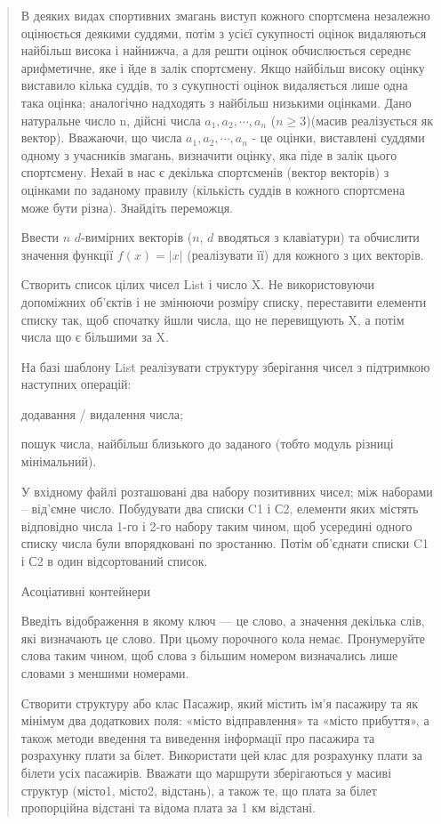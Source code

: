 \documentclass[]{article}
\begin{document}
\begin{quote}
В деяких видах спортивних змагань виступ кожного спортсмена незалежно
оцінюється деякими суддями, потім з усієї сукупності оцінок видаляються
найбільш висока і найнижча, а для решти оцінок обчислюється середнє
арифметичне, яке і йде в залік спортсмену. Якщо найбільш високу оцінку
виставило кілька суддів, то з сукупності оцінок видаляється лише одна
така оцінка; аналогічно надходять з найбільш низькими оцінками. Дано
натуральне число n, дійсні числа \(a_{1},a_{2},\cdots,a_{n}\)
(\(n \geq 3\))(масив реалізується як вектор). Вважаючи, що числа
\(a_{1},a_{2},\cdots,a_{n}\) - це оцінки, виставлені суддями одному з
учасників змагань, визначити оцінку, яка піде в залік цього спортсмену.
Нехай в нас є декілька спортсменів (вектор векторів) з оцінками по
заданому правилу (кількість суддів в кожного спортсмена може бути
різна). Знайдіть переможця.

Ввести $n$ $d$-вимірних векторів ($n$,
$d$ вводяться з клавіатури) та обчислити значення функції $f(x) = |x|$
(реалізувати її) для кожного з цих векторів.

Створить список цілих чисел List і
число X. Не використовуючи допоміжних об'єктів і не змінюючи розміру
списку, переставити елементи списку так, щоб спочатку йшли числа, що не
перевищують X, а потім числа що є більшими за X.



На базі шаблону List реалізувати структуру зберігання чисел з підтримкою
наступних операцій:

додавання / видалення числа;

пошук числа, найбільш близького до заданого (тобто модуль різниці
мінімальний).

У вхідному файлі розташовані два набору позитивних чисел; між наборами
-- від'ємне число. Побудувати два списки C1 і С2, елементи яких містять
відповідно числа 1-го і 2-го набору таким чином, щоб усередині одного
списку числа були впорядковані по зростанню. Потім об'єднати списки C1 і
С2 в один відсортований список.

Асоціативні контейнери

\protect\hypertarget{_Hlk65952259}{}{}Введіть відображення в якому ключ
--- це слово, а значення декілька слів, які визначають це слово. При
цьому порочного кола немає. Пронумеруйте слова таким чином, щоб слова з
більшим номером визначались лише словами з меншими номерами.

Створити структуру або клас Пасажир, який містить ім'я пасажиру та як
мінімум два додаткових поля: «місто відправлення» та «місто прибуття», а
також методи введення та виведення інформації про пасажира та розрахунку
плати за білет. Використати цей клас для розрахунку плати за білети усіх
пасажирів. Вважати що маршрути зберігаються у масиві структур (місто1,
місто2, відстань), а також те, що плата за білет пропорційна відстані та
відома плата за 1 км відстані.
\end{quote}
\end{document}
